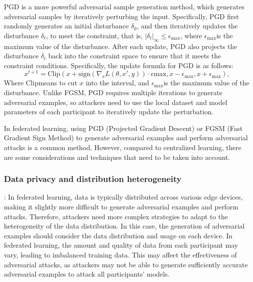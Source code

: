 \documentclass[conference]{IEEEtran}
\begin{document}
PGD\cite{b100} is a more powerful adversarial sample generation method,
which generates adversarial samples by iteratively perturbing the input.
Specifically, PGD first randomly generates an initial disturbance $\delta_0$,
and then iteratively updates the disturbance $\delta_t$, to meet the constraint,
that is, $|\delta_t|_{\infty} \leq \epsilon_{\text{max}}$,
where $\epsilon_{\text{max}}$is the maximum value of the disturbance.
After each update, PGD also projects the disturbance
$\delta_t$ back into the constraint space to ensure that it meets the
constraint conditions.
Specifically, the update formula for PGD is as follows:
\begin{equation}
    x^{t+1} = \text{Clip}(x + \text{sign}(\nabla_x L(\theta,x',y)) \cdot \epsilon{\text{max}}, x - \epsilon_{\text{max}}, x + \epsilon_{\text{max}}),
\end{equation}
Where $\text{Clip}$means to cut $x$ into the interval, and $\epsilon_ {\text{max}} $is the maximum value of the disturbance.
Unlike FGSM, PGD requires multiple iterations to generate adversarial examples,
so attackers need to use the local dataset and model parameters of each participant
to iteratively update the perturbation.

In federated learning, using PGD (Projected Gradient Descent) or FGSM
(Fast Gradient Sign Method) to generate adversarial examples and perform
adversarial attacks is a common method. However, compared to centralized
learning, there are some considerations and techniques that need to be
taken into account.

\subsubsection{Data privacy and distribution heterogeneity}: In federated learning, data is
typically distributed across various edge devices, making it slightly more
difficult to generate adversarial examples and perform attacks. Therefore,
attackers need more complex strategies to adapt to the heterogeneity of the
data distribution. In this case, the generation of adversarial examples should
consider the data distribution and usage on each device. In federated learning,
the amount and quality of data from each participant may vary, leading to
imbalanced training data. This may affect the effectiveness of adversarial attacks,
as attackers may not be able to generate sufficiently accurate adversarial
examples to attack all participants' models.
\end{document}
